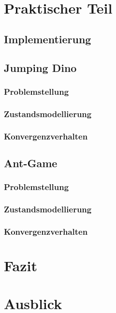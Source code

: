 \documentclass[12pt]{scrartcl}
\numberwithin{equation}{section}
\begin{document}
\section{Praktischer Teil}
	\subsection{Implementierung}
	
	\subsection{Jumping Dino}
		\subsubsection{Problemstellung}
		\subsubsection{Zustandsmodellierung}
		\subsubsection{Konvergenzverhalten}
	\subsection{Ant-Game}
		\subsubsection{Problemstellung}
		\subsubsection{Zustandsmodellierung}
		\subsubsection{Konvergenzverhalten}

\section{Fazit}
\section{Ausblick}

\pagebreak

\pagebreak


\end{document}
